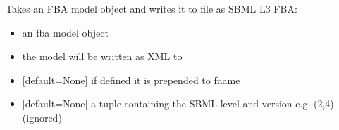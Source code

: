 \documentclass[letterpaper,10pt,english]{sphinxmanual}
\begin{document}

\begin{fulllineitems}
\label{\detokenize{modules_doc:cbmpy.CBXML.sbml_writeSBML2FBA}}
\pysigstartsignatures
{}
\pysigstopsignatures
\sphinxAtStartPar
Takes an FBA model object and writes it to file as SBML L3 FBA:
\begin{itemize}
\item {} 
\sphinxAtStartPar
{} an fba model object

\item {} 
\sphinxAtStartPar
{} the model will be written as XML to 

\item {} 
\sphinxAtStartPar
{} {[}default=None{]} if defined it is prepended to fname

\item {} 
\sphinxAtStartPar
{} {[}default=None{]} a tuple containing the SBML level and version e.g. (2,4) (ignored)

\end{itemize}

\end{fulllineitems}

\end{document}
